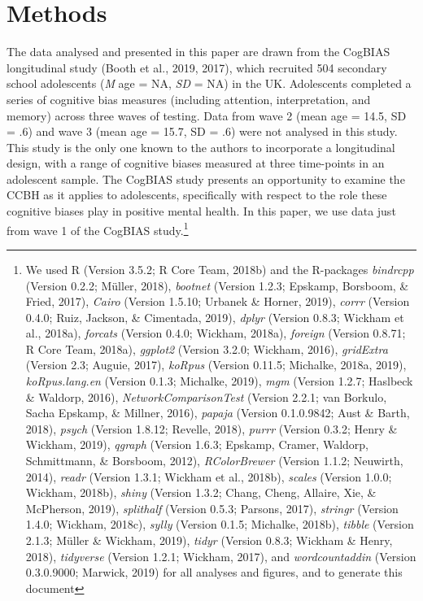 \documentclass[man,floatsintext]{apa6}
\let\rmarkdownfootnote\footnote%
\def\footnote{\protect\rmarkdownfootnote}
\begin{document}
\hypertarget{methods}{%
\section{Methods}\label{methods}}

The data analysed and presented in this paper are drawn from the CogBIAS longitudinal study (Booth et al., 2019, 2017), which recruited 504 secondary school adolescents (\emph{M} age = NA, \emph{SD} = NA) in the UK. Adolescents completed a series of cognitive bias measures (including attention, interpretation, and memory) across three waves of testing. Data from wave 2 (mean age = 14.5, SD = .6) and wave 3 (mean age = 15.7, SD = .6) were not analysed in this study. This study is the only one known to the authors to incorporate a longitudinal design, with a range of cognitive biases measured at three time-points in an adolescent sample. The CogBIAS study presents an opportunity to examine the CCBH as it applies to adolescents, specifically with respect to the role these cognitive biases play in positive mental health. In this paper, we use data just from wave 1 of the CogBIAS study.\footnote{We used R (Version 3.5.2; R Core Team, 2018b) and the R-packages \emph{bindrcpp} (Version 0.2.2; Müller, 2018), \emph{bootnet} (Version 1.2.3; Epskamp, Borsboom, \& Fried, 2017), \emph{Cairo} (Version 1.5.10; Urbanek \& Horner, 2019), \emph{corrr} (Version 0.4.0; Ruiz, Jackson, \& Cimentada, 2019), \emph{dplyr} (Version 0.8.3; Wickham et al., 2018a), \emph{forcats} (Version 0.4.0; Wickham, 2018a), \emph{foreign} (Version 0.8.71; R Core Team, 2018a), \emph{ggplot2} (Version 3.2.0; Wickham, 2016), \emph{gridExtra} (Version 2.3; Auguie, 2017), \emph{koRpus} (Version 0.11.5; Michalke, 2018a, 2019), \emph{koRpus.lang.en} (Version 0.1.3; Michalke, 2019), \emph{mgm} (Version 1.2.7; Haslbeck \& Waldorp, 2016), \emph{NetworkComparisonTest} (Version 2.2.1; van Borkulo, Sacha Epskamp, \& Millner, 2016), \emph{papaja} (Version 0.1.0.9842; Aust \& Barth, 2018), \emph{psych} (Version 1.8.12; Revelle, 2018), \emph{purrr} (Version 0.3.2; Henry \& Wickham, 2019), \emph{qgraph} (Version 1.6.3; Epskamp, Cramer, Waldorp, Schmittmann, \& Borsboom, 2012), \emph{RColorBrewer} (Version 1.1.2; Neuwirth, 2014), \emph{readr} (Version 1.3.1; Wickham et al., 2018b), \emph{scales} (Version 1.0.0; Wickham, 2018b), \emph{shiny} (Version 1.3.2; Chang, Cheng, Allaire, Xie, \& McPherson, 2019), \emph{splithalf} (Version 0.5.3; Parsons, 2017), \emph{stringr} (Version 1.4.0; Wickham, 2018c), \emph{sylly} (Version 0.1.5; Michalke, 2018b), \emph{tibble} (Version 2.1.3; Müller \& Wickham, 2019), \emph{tidyr} (Version 0.8.3; Wickham \& Henry, 2018), \emph{tidyverse} (Version 1.2.1; Wickham, 2017), and \emph{wordcountaddin} (Version 0.3.0.9000; Marwick, 2019) for all analyses and figures, and to generate this document}
\end{document}
